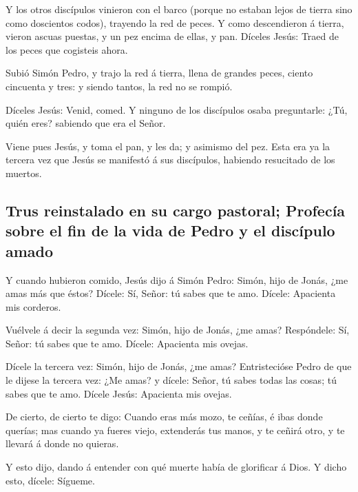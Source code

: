  Y los otros discípulos vinieron con el barco (porque no
estaban lejos de tierra sino como doscientos codos), trayendo la red de
peces.  Y como descendieron á tierra, vieron ascuas
puestas, y un pez encima de ellas, y pan.  Díceles Jesús:
Traed de los peces que cogisteis ahora.

 Subió Simón Pedro, y trajo la red á tierra, llena de
grandes peces, ciento cincuenta y tres: y siendo tantos, la red no se
rompió.

 Díceles Jesús: Venid, comed. Y ninguno de los discípulos
osaba preguntarle: ¿Tú, quién eres? sabiendo que era el Señor.

 Viene pues Jesús, y toma el pan, y les da; y asimismo
del pez.  Esta era ya la tercera vez que Jesús se
manifestó á sus discípulos, habiendo resucitado de los muertos.

\hypertarget{trus-reinstalado-en-su-cargo-pastoral-profecuxeda-sobre-el-fin-de-la-vida-de-pedro-y-el-discuxedpulo-amado}{%
\subsection{Trus reinstalado en su cargo pastoral; Profecía sobre el fin
de la vida de Pedro y el discípulo
amado}\label{trus-reinstalado-en-su-cargo-pastoral-profecuxeda-sobre-el-fin-de-la-vida-de-pedro-y-el-discuxedpulo-amado}}

 Y cuando hubieron comido, Jesús dijo á Simón Pedro:
Simón, hijo de Jonás, ¿me amas más que éstos? Dícele: Sí, Señor: tú
sabes que te amo. Dícele: Apacienta mis corderos.

 Vuélvele á decir la segunda vez: Simón, hijo de Jonás,
¿me amas? Respóndele: Sí, Señor: tú sabes que te amo. Dícele: Apacienta
mis ovejas.

 Dícele la tercera vez: Simón, hijo de Jonás, ¿me amas?
Entristecióse Pedro de que le dijese la tercera vez: ¿Me amas? y dícele:
Señor, tú sabes todas las cosas; tú sabes que te amo. Dícele Jesús:
Apacienta mis ovejas.

 De cierto, de cierto te digo: Cuando eras más mozo, te
ceñías, é ibas donde querías; mas cuando ya fueres viejo, extenderás tus
manos, y te ceñirá otro, y te llevará á donde no quieras.

 Y esto dijo, dando á entender con qué muerte había de
glorificar á Dios. Y dicho esto, dícele: Sígueme.


